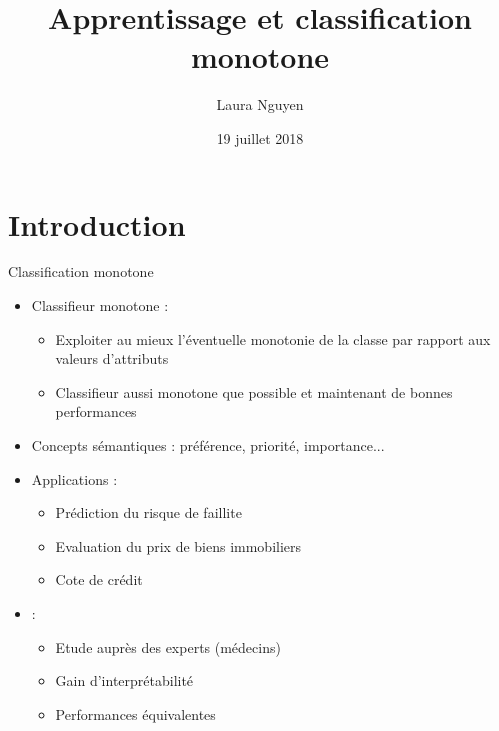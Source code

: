 \documentclass[usenames,dvipsnames]{beamer}
\title[Classification monotone]{Apprentissage et classification monotone}
\author{Laura Nguyen}
\institute{LFI}
\date{19 juillet 2018}
\begin{document}
\begin{frame}
  \titlepage
\end{frame}


\section{Introduction}

\begin{frame}{Classification monotone}
\begin{itemize}
\item Classifieur monotone :
    \begin{itemize}
        \item Exploiter au mieux l'éventuelle monotonie de la classe par rapport aux valeurs d'attributs
        \item Classifieur aussi monotone que possible et maintenant de bonnes performances
    \end{itemize}
\item Concepts sémantiques : préférence, priorité, importance...
\item Applications : 
    \begin{itemize}
        \item Prédiction du risque de faillite
        \item Evaluation du prix de biens immobiliers
        \item Cote de crédit 
    \end{itemize}
\item \textcite{pazzani-acceptance} :
    \begin{itemize}
        \item Etude auprès des experts (médecins)
        \item Gain d'interprétabilité
        \item Performances équivalentes 
    \end{itemize}
\end{itemize}
\end{frame}
\end{document}
